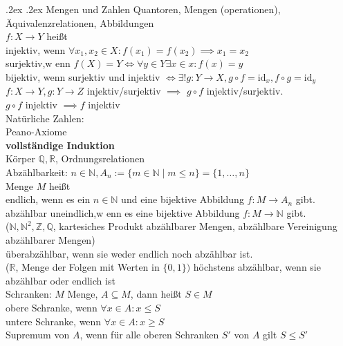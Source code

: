 \documentclass[9pt, landscape,a4paper]{extarticle}
\makeatletter
\renewcommand{\section}{\@startsection{section}{1}{0mm}%
                                {.2ex}%
                                {.2ex}%
                                {\sffamily\small\bfseries}}
\newcommand\id{\mathrm{id}}
\makeatother
\begin{document}
\small
\begin{multicols*}{4}
\raggedcolumns
  \section{Mengen und Zahlen}
  Quantoren, Mengen (operationen), Äquivalenzrelationen, Abbildungen \\
  $f: X\to Y$ heißt \\
  injektiv, wenn $\forall x_1, x_2 \in X: f(x_1) = f(x_2) \implies x_1 = x_2$ \\
  surjektiv,w enn $f(X) = Y \iff \forall y\in Y \exists x\in x: f(x) = y$ \\
  bijektiv, wenn surjektiv und injektiv $\iff \exists ! g: Y \to X, g\circ f = \id_x, f\circ g = \id_y$ \\
  $f: X\to Y, g: Y\to Z$ injektiv/surjektiv $\implies$ $g\circ f$ injektiv/surjektiv. \\
  $g\circ f$ injektiv $\implies f$ injektiv \\
  Natürliche Zahlen: \\
  Peano-Axiome \\
  \textbf{vollständige Induktion} \\
  Körper $\mathbb{Q}, \mathbb{R}$, Ordnungsrelationen \\
  Abzählbarkeit: $n\in \mathbb{N}, A_n := \{m\in \mathbb{N} \mid m\leq n\} = \{1, \ldots, n\}$ \\
  Menge $M$ heißt \\
  endlich, wenn es ein $n\in\mathbb{N}$ und eine bijektive Abbildung $f: M \to A_n$ gibt. \\
  abzählbar uneindlich,w enn es eine bijektive Abbildung $f: M\to \mathbb{N}$ gibt. \\
    ($\mathbb{N}, \mathbb{N}^2, \mathbb{Z}, \mathbb{Q}$, kartesiches Produkt abzählbarer Mengen, abzählbare Vereinigung abzählbarer Mengen) \\
  überabzählbar, wenn sie weder endlich noch abzählbar ist. \\
    ($\mathbb{R}$, Menge der Folgen mit Werten in $\{0, 1\})$
  höchstens abzählbar, wenn sie abzählbar oder endlich ist \\
  Schranken: $M$ Menge, $A\subseteq M$, dann heißt $S\in M$ \\
  obere Schranke, wenn $\forall x\in A: x\leq S$ \\
  untere Schranke, wenn $\forall x\in A: x\geq S$ \\
  Supremum von $A$, wenn für alle oberen Schranken $S'$ von $A$ gilt $S\leq S'$ \\

\end{multicols*}
\end{document}
